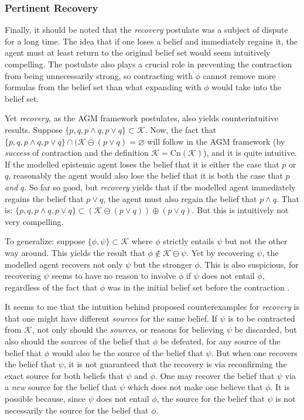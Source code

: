 \documentclass[12pt]{article}
\newcommand{\K}{\mathcal{K}}
\begin{document}
\subsubsection{Pertinent Recovery}
Finally, it should be noted that the \textit{recovery} postulate was a subject of dispute for a long time. The idea that if one loses a belief and immediately regains it, the agent must at least return to the original belief set would seem intuitively compelling. The postulate also plays a crucial role in preventing the contraction from being unnecessarily strong, so contracting with $\phi$ cannot remove more formulas from the belief set than what expanding with $\phi$ would take into the belief set. 
\par
Yet \textit{recovery}, as the AGM framework postulates, also yields counterintuitive results. Suppose $\{p, q, p \land q, p \lor q\} \subset \K$. Now, the fact that $\{p, q, p \land q, p \lor q\} \cap (\K \ominus (p\lor q) = \varnothing$ will follow in the AGM framework (by \textit{success} of contraction and the definition $\K = \text{Cn}(\K)$), and it is quite intuitive. If the modelled epistemic agent loses the belief that it is either the case that $p$ or $q$, reasonably the agent would also lose the belief that it is both the case that $p$ \textit{ and } $q$. So far so good, but \textit{recovery} yields that if the modelled agent immediately regains the belief that $p \lor q$, the agent must also regain the belief that $p \land q$. That is: $\{p, q, p \land q, p \lor q\} \subset (\K \ominus (p \lor q)) \oplus (p \lor q)$. But this is intuitively not very compelling.
\par
To generalize: suppose $\{\phi, \psi \} \subset \K$ where $\phi$ strictly entails $\psi$ but not the other way around. This yields the result that $\phi \notin \K \ominus \psi$. Yet by recovering $\psi$, the modelled agent recovers not only $\psi$ but the stronger $\phi$. This is also suspicious, for recovering $\psi$ seems to have no reason to involve $\phi$ if $\psi$ does not entail $\phi$, regardless of the fact that $\phi$ was in the initial belief set before the contraction \cite{sep-logic-belief-revision}.  
\par
It seems to me that the intuition behind proposed counterexamples for \textit{recovery} is that one might have different \textit{sources} for the same belief. If $\psi$ is to be contracted from $\K$, not only should the \textit{sources}, or reasons for believing $\psi$ be discarded, but also should the sources of the belief that $\phi$ be defeated, for any source of the belief that $\phi$ would also be the source of the belief that $\psi$. But when one recovers the belief that $\psi$, it is not guaranteed that the recovery is via reconfirming the exact source for both beliefs that $\psi$ and $\phi$. One may recover the belief that $\psi$ via a \textit{new} source for the belief that $\psi$ which does not make one believe that $\phi$. It is possible because, since $\psi$ does not entail $\phi$, the source for the belief that $\psi$ is not necessarily the source for the belief that $\phi$. 
\end{document}
